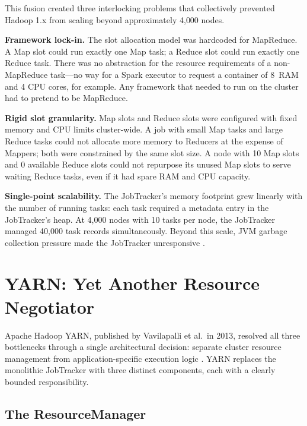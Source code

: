 This fusion created three interlocking problems that collectively
prevented Hadoop 1.x from scaling beyond approximately 4{,}000 nodes.

\textbf{Framework lock-in.} The slot allocation model was hardcoded for
MapReduce. A Map slot could run exactly one Map task; a Reduce slot could
run exactly one Reduce task. There was no abstraction for the resource
requirements of a non-MapReduce task---no way for a Spark executor to
request a container of 8\GB\ RAM and 4 CPU cores, for example. Any
framework that needed to run on the cluster had to pretend to be MapReduce.

\textbf{Rigid slot granularity.} Map slots and Reduce slots were
configured with fixed memory and CPU limits cluster-wide. A job with
small Map tasks and large Reduce tasks could not allocate more memory
to Reducers at the expense of Mappers; both were constrained by the
same slot size. A node with 10 Map slots and 0 available Reduce slots
could not repurpose its unused Map slots to serve waiting Reduce tasks,
even if it had spare RAM and CPU capacity.

\textbf{Single-point scalability.} The JobTracker's memory footprint
grew linearly with the number of running tasks: each task required a
metadata entry in the JobTracker's heap. At 4{,}000 nodes with 10 tasks
per node, the JobTracker managed 40{,}000 task records simultaneously.
Beyond this scale, JVM garbage collection pressure made the JobTracker
unresponsive \parencite{YARN2013}.

\section{YARN: Yet Another Resource Negotiator}
\label{sec:yarn}

Apache Hadoop YARN, published by Vavilapalli et al.\ in 2013, resolved
all three bottlenecks through a single architectural decision: separate
cluster resource management from application-specific execution logic
\parencite{YARN2013}. YARN replaces the monolithic JobTracker with three
distinct components, each with a clearly bounded responsibility.

\subsection{The ResourceManager}
\label{subsec:rm}


